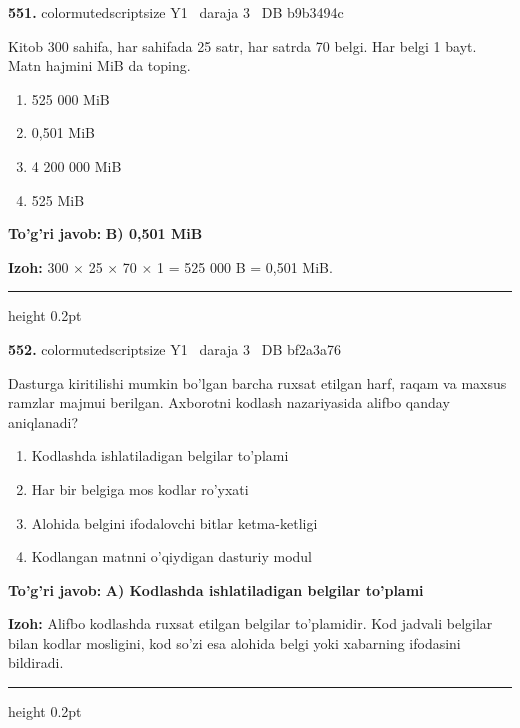 \documentclass[10pt,a4paper,oneside]{article}
\begin{document}
\noindent\textbf{\color{ink}551.}  {color{muted}scriptsize Y1 \textbullet\ daraja 3 \textbullet\ DB b9b3494c}
\par
Kitob 300 sahifa, har sahifada 25 satr, har satrda 70 belgi. Har belgi 1 bayt. Matn hajmini MiB da toping.
\begin{enumerate}[label=\Alph*),leftmargin=9mm]
\item 525 000 MiB
\item 0,501 MiB
\item 4 200 000 MiB
\item 525 MiB
\end{enumerate}
\begin{tcolorbox}[enhanced,breakable,colback=teal!4,colframe=teal!50!black,boxrule=0.5pt,arc=1.1mm,left=3mm,right=3mm,top=1.7mm,bottom=1.7mm,before skip=2mm,after skip=2mm]
\textbf{\color{teal}To'g'ri javob:} \textbf{B) 0,501 MiB}
\par\smallskip
\textbf{Izoh:} 300 \ensuremath{\times} 25 \ensuremath{\times} 70 \ensuremath{\times} 1 = 525 000 B = 0,501 MiB.
\end{tcolorbox}
\vspace{2mm}\hrule height 0.2pt \vspace{3mm}

\noindent\textbf{\color{ink}552.}  {color{muted}scriptsize Y1 \textbullet\ daraja 3 \textbullet\ DB bf2a3a76}
\par
Dasturga kiritilishi mumkin bo'lgan barcha ruxsat etilgan harf, raqam va maxsus ramzlar majmui berilgan. Axborotni kodlash nazariyasida alifbo qanday aniqlanadi?
\begin{enumerate}[label=\Alph*),leftmargin=9mm]
\item Kodlashda ishlatiladigan belgilar to'plami
\item Har bir belgiga mos kodlar ro'yxati
\item Alohida belgini ifodalovchi bitlar ketma-ketligi
\item Kodlangan matnni o'qiydigan dasturiy modul
\end{enumerate}
\begin{tcolorbox}[enhanced,breakable,colback=teal!4,colframe=teal!50!black,boxrule=0.5pt,arc=1.1mm,left=3mm,right=3mm,top=1.7mm,bottom=1.7mm,before skip=2mm,after skip=2mm]
\textbf{\color{teal}To'g'ri javob:} \textbf{A) Kodlashda ishlatiladigan belgilar to'plami}
\par\smallskip
\textbf{Izoh:} Alifbo kodlashda ruxsat etilgan belgilar to'plamidir. Kod jadvali belgilar bilan kodlar mosligini, kod so'zi esa alohida belgi yoki xabarning ifodasini bildiradi.
\end{tcolorbox}
\vspace{2mm}\hrule height 0.2pt \vspace{3mm}
\end{document}
